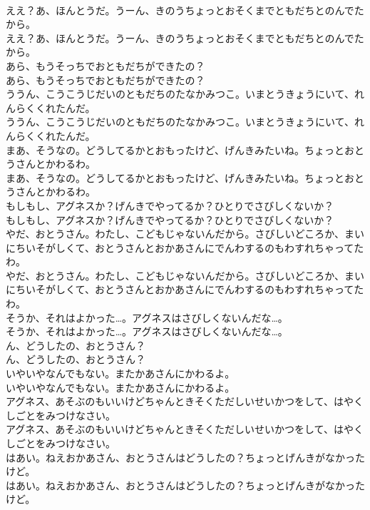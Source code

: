\documentclass[8pt]{extreport}
\begin{document}
\begin{CJK}{UTF8}{min}
\\	ええ？あ、ほんとうだ。うーん、きのうちょっとおそくまでともだちとのんでたから。	
\\	ええ？あ、ほんとうだ。うーん、きのうちょっとおそくまでともだちとのんでたから。 
\\	あら、もうそっちでおともだちができたの？	
\\	あら、もうそっちでおともだちができたの？ 
\\	ううん、こうこうじだいのともだちのたなかみつこ。いまとうきょうにいて、れんらくくれたんだ。	
\\	ううん、こうこうじだいのともだちのたなかみつこ。いまとうきょうにいて、れんらくくれたんだ。 
\\	まあ、そうなの。どうしてるかとおもったけど、げんきみたいね。ちょっとおとうさんとかわるわ。	
\\	まあ、そうなの。どうしてるかとおもったけど、げんきみたいね。ちょっとおとうさんとかわるわ。 
\\	もしもし、アグネスか？げんきでやってるか？ひとりでさびしくないか？	
\\	もしもし、アグネスか？げんきでやってるか？ひとりでさびしくないか？ 
\\	やだ、おとうさん。わたし、こどもじゃないんだから。さびしいどころか、まいにちいそがしくて、おとうさんとおかあさんにでんわするのもわすれちゃってたわ。	
\\	やだ、おとうさん。わたし、こどもじゃないんだから。さびしいどころか、まいにちいそがしくて、おとうさんとおかあさんにでんわするのもわすれちゃってたわ。 
\\	そうか、それはよかった…。アグネスはさびしくないんだな…。	
\\	そうか、それはよかった…。アグネスはさびしくないんだな…。 
\\	ん、どうしたの、おとうさん？	
\\	ん、どうしたの、おとうさん？ 
\\	いやいやなんでもない。またかあさんにかわるよ。	
\\	いやいやなんでもない。またかあさんにかわるよ。 
\\	アグネス、あそぶのもいいけどちゃんときそくただしいせいかつをして、はやくしごとをみつけなさい。	
\\	アグネス、あそぶのもいいけどちゃんときそくただしいせいかつをして、はやくしごとをみつけなさい。 
\\	はあい。ねえおかあさん、おとうさんはどうしたの？ちょっとげんきがなかったけど。	
\\	はあい。ねえおかあさん、おとうさんはどうしたの？ちょっとげんきがなかったけど。 

\end{CJK}
\end{document}
